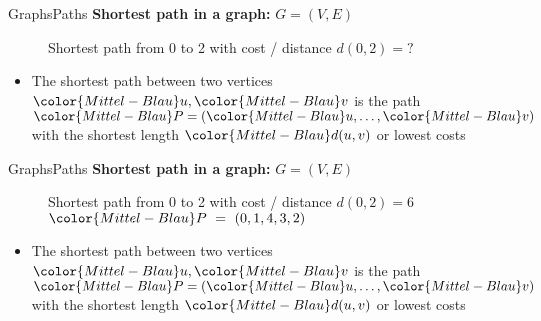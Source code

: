 \begin{frame}{Graphs}{Paths}
  \textbf{Shortest path in a graph:}
         {\color{Mittel-Blau}$G = (V , E)$}
  \begin{figure}
    \begin{adjustbox}{width=0.75\linewidth}
      
    \end{adjustbox}
    \caption{{\color{Mittel-Blau}Shortest path} from 0 to 2 with cost / distance
      {\color{Mittel-Blau}$d(0,2) = ?$}
     }
    \label{fig:graphs:shortest_path}
  \end{figure}
  \begin{itemize}
    \item<3->
      The {\color{Mittel-Blau}shortest path} between two vertices
      ${\color{Mittel-Blau}u}, {\color{Mittel-Blau}v}$ is the path
      \begin{math}
        {\color{Mittel-Blau}P}
          = ({\color{Mittel-Blau}u}, \dots, {\color{Mittel-Blau}v})
      \end{math}
      with the shortest length ${\color{Mittel-Blau}d(u,v)}$ or lowest costs
  \end{itemize}
\end{frame}

\begin{frame}{Graphs}{Paths}
  \textbf{Shortest path in a graph:}
         {\color{Mittel-Blau}$G = (V , E)$}
  \begin{figure}
    \begin{adjustbox}{width=0.75\linewidth}
      
    \end{adjustbox}
    \caption{{\color{Mittel-Blau}Shortest path} from 0 to 2 with cost / distance
      {\color{Mittel-Blau}$d(0,2) = 6$}
      ${\color{Mittel-Blau}P}~=~(0, 1, 4, 3, 2)$}
  \end{figure}
  \begin{itemize}
    \item
      The {\color{Mittel-Blau}shortest path} between two vertices
      ${\color{Mittel-Blau}u}, {\color{Mittel-Blau}v}$ is the path
      \begin{math}
        {\color{Mittel-Blau}P}
          = ({\color{Mittel-Blau}u}, \dots, {\color{Mittel-Blau}v})
      \end{math}
      with the shortest length ${\color{Mittel-Blau}d(u,v)}$ or lowest costs
  \end{itemize}
\end{frame}

